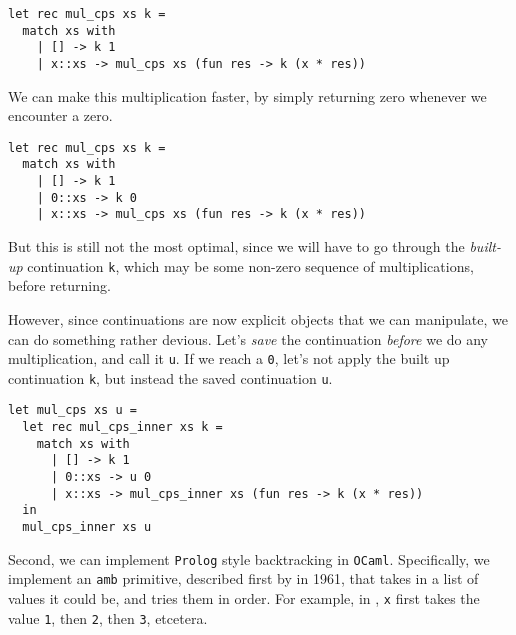 \begin{code}
\label{code:mul-ocaml-fast}
\begin{verbatim}
let rec mul_cps xs k = 
  match xs with
    | [] -> k 1
    | x::xs -> mul_cps xs (fun res -> k (x * res))
\end{verbatim}
\end{code}

We can make this multiplication faster, by simply returning zero whenever we encounter a zero. 

\begin{code}
\label{code:mul-ocaml-fastest}
\begin{verbatim}
let rec mul_cps xs k = 
  match xs with
    | [] -> k 1
    | 0::xs -> k 0
    | x::xs -> mul_cps xs (fun res -> k (x * res))
\end{verbatim}
\end{code}

But this is still not the most optimal, since we will have to go through the \emph{built-up} continuation \texttt{k}, which may be some non-zero sequence of multiplications, before returning. 

However, since continuations are now explicit objects that we can manipulate, we can do something rather devious. Let's \emph{save} the continuation \emph{before} we do any multiplication, and call it \texttt{u}. If we reach a \texttt{0}, let's not apply the built up continuation \texttt{k}, but instead the saved continuation \texttt{u}.

\begin{code}
\label{code:fib-ocaml-again}
\begin{verbatim}
let mul_cps xs u = 
  let rec mul_cps_inner xs k = 
    match xs with
      | [] -> k 1
      | 0::xs -> u 0
      | x::xs -> mul_cps_inner xs (fun res -> k (x * res))
  in
  mul_cps_inner xs u
\end{verbatim}
\end{code}

Second, we can implement \texttt{Prolog} style backtracking in \texttt{OCaml}. Specifically, we implement an \texttt{amb} primitive, described first by \citet{mccarthy-1963} in 1961, that takes in a list of values it could be, and tries them in order. For example, in , \texttt{x} first takes the value \texttt{1}, then \texttt{2}, then \texttt{3}, etcetera.

